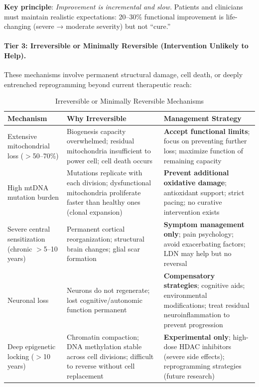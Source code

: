 \textbf{Key principle}: \textit{Improvement is incremental and slow.} Patients and clinicians must maintain realistic expectations: 20--30\% functional improvement is life-changing (severe → moderate severity) but not ``cure.''

\paragraph{Tier 3: Irreversible or Minimally Reversible (Intervention Unlikely to Help).}

These mechanisms involve permanent structural damage, cell death, or deeply entrenched reprogramming beyond current therapeutic reach:

\begin{table}[htbp]
\centering
\caption{Irreversible or Minimally Reversible Mechanisms}
\label{tab:reversible-tier3}
\small
\begin{tabular}{@{}p{3.5cm}p{5.5cm}p{4.5cm}@{}}
\toprule
\textbf{Mechanism} & \textbf{Why Irreversible} & \textbf{Management Strategy} \\
\midrule
Extensive mitochondrial loss ($>$50--70\%) & Biogenesis capacity overwhelmed; residual mitochondria insufficient to power cell; cell death occurs & \textbf{Accept functional limits}; focus on preventing further loss; maximize function of remaining capacity \\
\addlinespace
High mtDNA mutation burden & Mutations replicate with each division; dysfunctional mitochondria proliferate faster than healthy ones (clonal expansion) & \textbf{Prevent additional oxidative damage}; antioxidant support; strict pacing; no curative intervention exists \\
\addlinespace
Severe central sensitization (chronic $>$5--10 years) & Permanent cortical reorganization; structural brain changes; glial scar formation & \textbf{Symptom management only}; pain psychology; avoid exacerbating factors; LDN may help but no reversal \\
\addlinespace
Neuronal loss & Neurons do not regenerate; lost cognitive/autonomic function permanent & \textbf{Compensatory strategies}; cognitive aids; environmental modifications; treat residual neuroinflammation to prevent progression \\
\addlinespace
Deep epigenetic locking ($>$10 years) & Chromatin compaction; DNA methylation stable across cell divisions; difficult to reverse without cell replacement & \textbf{Experimental only}; high-dose HDAC inhibitors (severe side effects); reprogramming strategies (future research) \\

\end{tabular}
\end{table}
